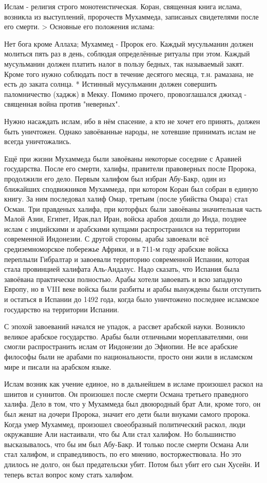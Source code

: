 Ислам - религия строго монотеистическая. Коран, священная книга ислама, возникла из выступлений, пророчеств Мухаммеда, записаных свидетелями после его смерти. > Основные его положения ислама:

    Нет бога кроме Аллаха; Мухаммед - Пророк его. Каждый мусульманин должен молиться пять раз в день, соблюдая определённые ритуалы при этом. Каждый мусульманин должен платить налог в пользу бедных, так называемый закят. Кроме того нужно соблюдать пост в течение десятого месяца, т.н. рамазана, не есть до заката солнца. * Истинный мусульманин должен совершить паломничество (хаджж) в Мекку. Помимо прочего, провозглашался джихад - священная война против "неверных".

Нужно насаждать ислам, ибо в нём спасение, а кто не хочет его принять, должен быть уничтожен. Однако завоёванные народы, не хотевшие принимать ислам не всегда уничтожались.

Ещё при жизни Мухаммеда были завоёваны некоторые соседние с Аравией государства. После его смерти, халифы, правители правоверных после Пророка, продолжили его дело. Первым халифом был избран Абу-Бакр, один из ближайших сподвижников Мухаммеда, при котором Коран был собран в единую книгу. За ним последовал халиф Омар, третьим (после убийства Омара) стал Осман. Три правденых халифа, при которфых были завоёваны значительная часть Малой Азии, Египет, Ирак,пал Иран, войска арабов дошли до Инда, позднее ислам с индийскими и арабскими купцами распространился на территории современной Индонезии. С другой стороны, арабы завоевали всё средиземноморское побережье Африки, и в 711-м году арабские войска переплыли Гибралтар и завоевали территорию современной Испании, которая стала провинцией халифата Аль-Андалус. Надо сказать, что Испания была завоёвана практически полностью. Арабы хотели завоевать и всю западную Европу, но в VIII веке войска были разбиты и арабы вынуждены были отступить и остаться в Испании до 1492 года, когда было уничтожено последнее исламское государство на территории Испании.

С эпохой завоеваний начался не упадок, а рассвет арабской науки. Возникло великое арабское государство. Арабы были отличными мореплавателями, они смогли распространить ислам от Индонезии до Эфиопии. Не все арабские философы были не арабами по национальности, просто они жили в исламском мире и писали на арабском языке.

Ислам возник как учение единое, но в дальнейшем в исламе произошел раскол на шиитов и суннитов. Он произошел после смерти Османа третьего праведного халифа. Дело в том, что у Мухаммеда был двоюродный брат Али, кроме того, он был женат на дочери Пророка, значит его дети были внуками самого пророка. Когда умер Мухаммед, произошел своеобразный политический раскол, люди окружавшие Али настаивали, что бы Али стал халифом. Но большинство высказывалось, что бы им был Абу-Бакр. И только после смерти Османа Али стал халифом, и справедливость, по его мнению, восторжествовала. Но это длилось не долго, он был предательски убит. Потом был убит его сын Хусейн. И теперь встал вопрос кому стать халифом.

